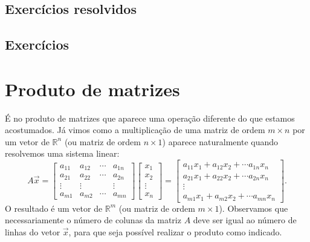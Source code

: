 \documentclass[../livro.tex]{subfiles}  %
\begin{document}
\subsection*{Exercícios resolvidos}

\construirExeresol

\subsection*{Exercícios}

\construirExer


\section{Produto de matrizes}

É no produto de matrizes que aparece uma operação diferente do que estamos acostumados. Já vimos como a multiplicação de uma matriz de ordem $m\times n$ por um vetor de $\mathbb{R}^n$ (ou matriz de ordem $n\times 1$) aparece naturalmente quando resolvemos uma sistema linear:
\begin{equation}
A \vec{x} = \left[
\begin{array}{cccc}
a_{11} & a_{12} & \cdots & a_{1n} \\
a_{21} & a_{22} & \cdots & a_{2n} \\
\vdots & \vdots &        & \vdots \\
a_{m1} & a_{m2} & \cdots & a_{mn} 
\end{array}
\right]
\left[
\begin{array}{c}
x_{1} \\
x_{2} \\
\vdots \\
x_{n} 
\end{array}
\right] =
\left[
\begin{array}{c}
a_{11} x_{1} + a_{12} x_{2} + \cdots  a_{1n} x_{n} \\
a_{21} x_{1} + a_{22} x_{2} + \cdots  a_{2n} x_{n} \\
\vdots \\
a_{m1} x_{1} + a_{m2} x_{2} + \cdots  a_{mn} x_{n} 
\end{array}
\right].
\end{equation} O resultado é um vetor  de $\mathbb{R}^m$ (ou matriz de ordem $m\times 1$). Observamos que necessariamente o número de colunas da matriz $A$ deve ser igual ao número de linhas do vetor $\vec{x}$, para que seja possível realizar o produto como indicado.
\end{document}
